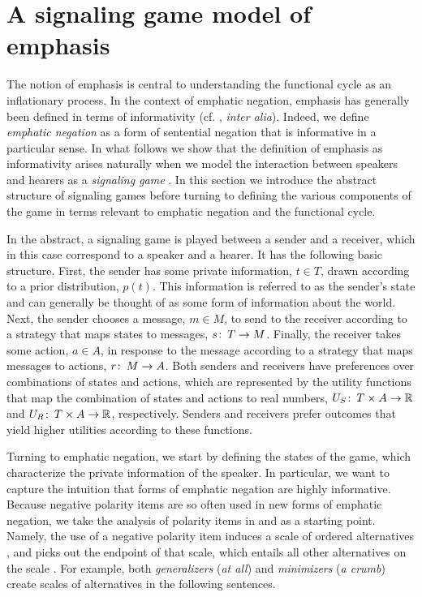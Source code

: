 \documentclass[linguex]{sp}
\theoremstyle{definition} \newtheorem{definition}{Definition}
\begin{document}
\section{A signaling game model of emphasis}
\label{Signaling}

The notion of emphasis is central to understanding the functional cycle as an inflationary process. In the context of emphatic negation, emphasis has generally been defined in terms of informativity (cf. \citealt{krifka1995polarity, detges-waltereit2002, kiparsky-condoravdi:2006}, \emph{inter alia}).  Indeed, we define \emph{emphatic negation} as a form of sentential negation that is informative in a particular sense. In what follows we show that the definition of emphasis as informativity arises naturally when we model the interaction between speakers and hearers as a \emph{signaling game} \citep{lewis:1969}. In this section we introduce the abstract structure of signaling games before turning to defining the various components of the game in terms relevant to emphatic negation and the functional cycle. 

In the abstract, a signaling game is played between a sender and a receiver, which in this case correspond to a speaker and a hearer. It has the following basic structure. First, the sender has some private information, $t \in T$, drawn according to a prior distribution, $p(t)$. This information is referred to as the sender's state and can generally be thought of as some form of information about the world. Next, the sender chooses a message, $m \in M$, to send to the receiver according to a strategy that maps states to messages, $s \colon\thinspace T \rightarrow M$. Finally, the receiver takes some action, $a \in A$, in response to the message according to a strategy that maps messages to actions, $r \colon\thinspace M \rightarrow A$. Both senders and receivers have preferences over combinations of states and actions, which are represented by the utility functions that map the combination of states and actions to real numbers, $U_S \colon\thinspace T \times A \rightarrow \mathbb{R}$ and  $U_R \colon\thinspace T \times A \rightarrow \mathbb{R}$, respectively. Senders and receivers prefer outcomes that yield higher utilities according to these functions.

Turning to emphatic negation, we start by defining the states of the game, which characterize the private information of the speaker. In particular, we want to capture the intuition that forms of emphatic negation are highly informative. Because negative polarity items are so often used in new forms of emphatic negation, we take the analysis of polarity items in \cite{krifka1995polarity} and  \cite{eckardt2006} as a starting point. Namely, the use of a negative polarity item induces  a scale of ordered alternatives \citep{rooth1992}, and picks out the endpoint of that scale, which entails all other alternatives on the scale \citep{fauconnier1975, horn:1989}. For example, both \emph{generalizers} (\emph{at all}) and \emph{minimizers} (\emph{a crumb}) create scales of alternatives in the following sentences.
\end{document}
